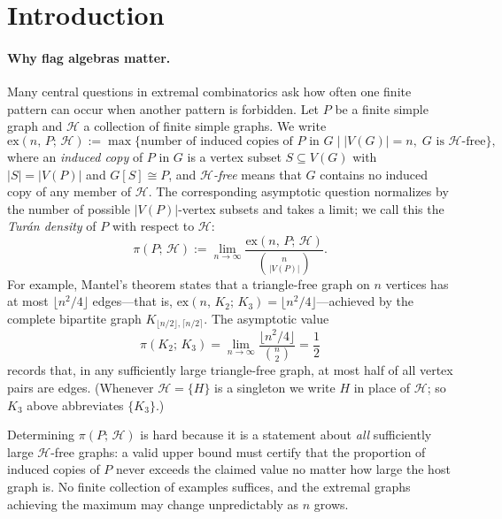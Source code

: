 \documentclass{article}
\newcommand{\tdensity}[2]{\pi(#1;\,#2)}
\begin{document}
\section{Introduction}
\label{sec:intro}

\paragraph{Why flag algebras matter.}
Many central questions in extremal combinatorics ask how often one finite
pattern can occur when another pattern is forbidden.  Let $P$ be a finite
simple graph and $\mathcal{H}$ a collection of finite simple graphs.  We write
\[
  \mathrm{ex}(n,\,P;\,\mathcal{H})
  :=
  \max\bigl\{
    \text{number of induced copies of }P\text{ in }G
    \mid |V(G)|=n,\; G\text{ is }\mathcal{H}\text{-free}
  \bigr\},
\]
where an \emph{induced copy} of $P$ in $G$ is a vertex subset
$S\subseteq V(G)$ with $|S|=|V(P)|$ and $G[S]\cong P$, and
\emph{$\mathcal{H}$-free} means that $G$ contains no induced copy of any
member of $\mathcal{H}$.  The corresponding asymptotic
question normalizes by the number of possible $|V(P)|$-vertex subsets and
takes a limit; we call this the \emph{Turán density} of $P$ with respect to $\mathcal{H}$:
\[
  \tdensity{P}{\mathcal{H}}
  :=
  \lim_{n\to\infty}
  \frac{\mathrm{ex}(n,\,P;\,\mathcal{H})}{\binom{n}{|V(P)|}}.
\]
For example, Mantel's theorem states that a triangle-free graph on $n$
vertices has at most $\lfloor n^2/4\rfloor$ edges---that is,
$\mathrm{ex}(n,\,K_2;\,K_3)=\lfloor n^2/4\rfloor$---achieved by the
complete bipartite graph $K_{\lfloor n/2\rfloor,\lceil n/2\rceil}$.  The
asymptotic value
\[
  \tdensity{K_2}{K_3}
  = \lim_{n\to\infty}\frac{\lfloor n^2/4\rfloor}{\binom{n}{2}}
  = \frac{1}{2}
\]
records that, in any sufficiently large triangle-free graph, at most half of
all vertex pairs are edges.  (Whenever $\mathcal{H}=\{H\}$ is a singleton we
write $H$ in place of $\mathcal{H}$; so $K_3$ above abbreviates $\{K_3\}$.)

Determining $\tdensity{P}{\mathcal{H}}$ is hard because it is a statement
about \emph{all} sufficiently large $\mathcal{H}$-free graphs: a valid upper
bound must certify that the proportion of induced copies of $P$ never exceeds
the claimed value no matter how large the host graph is.  No finite collection of examples
suffices, and the extremal graphs achieving the maximum may change
unpredictably as $n$ grows.
\end{document}
